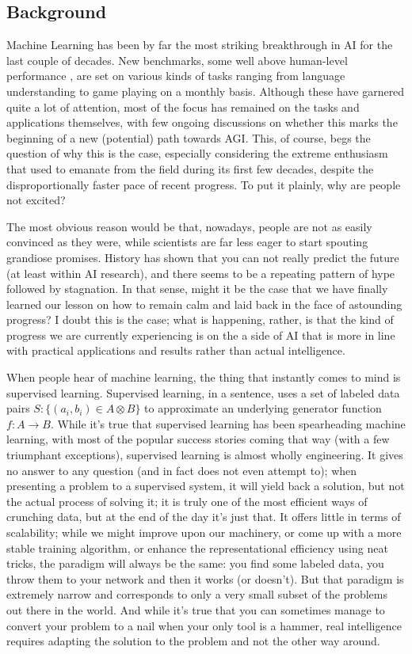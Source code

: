 \documentclass[]{article}
\begin{document}
\subsection{Background}\label{subsec:Background}
Machine Learning has been by far the most striking breakthrough in AI for the last couple of decades. New benchmarks, some well above human-level performance , are set on various kinds of tasks ranging from language understanding to game playing on a monthly basis. Although these have garnered quite a lot of attention, most of the focus has remained on the tasks and applications themselves, with few ongoing discussions on whether this marks the beginning of a new (potential) path towards AGI. This, of course, begs the question of why this is the case, especially considering the extreme enthusiasm that used to emanate from the field during its first few decades, despite the disproportionally faster pace of recent progress. To put it plainly, why are people not excited?

The most obvious reason would be that, nowadays, people are not as easily convinced as they were, while scientists are far less eager to start spouting grandiose promises. History has shown that you can not really predict the future (at least within AI research), and there seems to be a repeating pattern of hype followed by stagnation. In that sense, might it be the case that we have finally learned our lesson on how to remain calm and laid back in the face of astounding progress?
I doubt this is the case; what is happening, rather, is that the kind of progress we are currently experiencing is on the a side of AI that is more in line with practical applications and results rather than actual intelligence.

When people hear of machine learning, the thing that instantly comes to mind is supervised learning. Supervised learning, in a sentence, uses a set of labeled data pairs $S: \{ (a_i, b_i) \in A \otimes B \}$ to approximate an underlying generator function $f: A \rightarrow B$. While it's true that supervised learning has been spearheading machine learning, with most of the popular success stories coming that way (with a few triumphant exceptions), supervised learning is almost wholly engineering. It gives no answer to any question (and in fact does not even attempt to); when presenting a problem to a supervised system, it will yield back a solution, but not the actual process of solving it; it is truly one of the most efficient ways of crunching data, but at the end of the day it's just that. It offers little in terms of scalability; while we might improve upon our machinery, or come up with a more stable training algorithm, or enhance the representational efficiency using neat tricks, the paradigm will always be the same: you find some labeled data, you throw them to your network and then it works (or doesn't). But that paradigm is extremely narrow and corresponds to only a very small subset of the problems out there in the world. And while it's true that you can sometimes manage to convert your problem to a nail when your only tool is a hammer, real intelligence requires adapting the solution to the problem and not the other way around.
\end{document}
